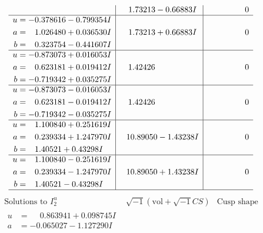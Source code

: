 \documentclass[1p]{elsarticle_modified}
\theoremstyle{definition}
\newcommand{\I}{\sqrt{-1}}
\begin{document}
$$\begin{array}{c|c|c}
 & \phantom{-}1.73213 - 0.66883 I & \phantom{-0.000000 } 0 \\ \hline\begin{aligned}
u &= -0.378616 - 0.799354 I \\
a &= \phantom{-}1.026480 + 0.036530 I \\
b &= \phantom{-}0.323754 - 0.441607 I\end{aligned}
 & \phantom{-}1.73213 + 0.66883 I & \phantom{-0.000000 } 0 \\ \hline\begin{aligned}
u &= -0.873073 + 0.016053 I \\
a &= \phantom{-}0.623181 + 0.019412 I \\
b &= -0.719342 + 0.035275 I\end{aligned}
 & \phantom{-}1.42426\phantom{ +0.000000I} & \phantom{-0.000000 } 0 \\ \hline\begin{aligned}
u &= -0.873073 - 0.016053 I \\
a &= \phantom{-}0.623181 - 0.019412 I \\
b &= -0.719342 - 0.035275 I\end{aligned}
 & \phantom{-}1.42426\phantom{ +0.000000I} & \phantom{-0.000000 } 0 \\ \hline\begin{aligned}
u &= \phantom{-}1.100840 + 0.251619 I \\
a &= \phantom{-}0.239334 + 1.247970 I \\
b &= \phantom{-}1.40521 + 0.43298 I\end{aligned}
 & \phantom{-}10.89050 - 1.43238 I & \phantom{-0.000000 } 0 \\ \hline\begin{aligned}
u &= \phantom{-}1.100840 - 0.251619 I \\
a &= \phantom{-}0.239334 - 1.247970 I \\
b &= \phantom{-}1.40521 - 0.43298 I\end{aligned}
 & \phantom{-}10.89050 + 1.43238 I & \phantom{-0.000000 } 0\\
 \hline 
 \end{array}$$\newpage$$\begin{array}{c|c|c}  
\text{Solutions to }I^u_{2}& \I (\text{vol} + \sqrt{-1}CS) & \text{Cusp shape}\\
 \hline 
\begin{aligned}
u &= \phantom{-}0.863941 + 0.098745 I \\
a &= -0.065027 - 1.127290 I \\

\end{aligned}
\end{array}$$
\end{document}
